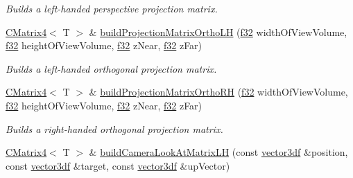 \begin{DoxyCompactItemize}
\begin{DoxyCompactList}\small\item\em Builds a left-\/handed perspective projection matrix. \end{DoxyCompactList}\item 
\hyperlink{classirr_1_1core_1_1CMatrix4}{C\+Matrix4}$<$ T $>$ \& \hyperlink{classirr_1_1core_1_1CMatrix4_ae4a0618e2da724a26a5d8a201a63d8a5}{build\+Projection\+Matrix\+Ortho\+LH} (\hyperlink{namespaceirr_a0277be98d67dc26ff93b1a6a1d086b07}{f32} width\+Of\+View\+Volume, \hyperlink{namespaceirr_a0277be98d67dc26ff93b1a6a1d086b07}{f32} height\+Of\+View\+Volume, \hyperlink{namespaceirr_a0277be98d67dc26ff93b1a6a1d086b07}{f32} z\+Near, \hyperlink{namespaceirr_a0277be98d67dc26ff93b1a6a1d086b07}{f32} z\+Far)\hypertarget{classirr_1_1core_1_1CMatrix4_ae4a0618e2da724a26a5d8a201a63d8a5}{}\label{classirr_1_1core_1_1CMatrix4_ae4a0618e2da724a26a5d8a201a63d8a5}

\begin{DoxyCompactList}\small\item\em Builds a left-\/handed orthogonal projection matrix. \end{DoxyCompactList}\item 
\hyperlink{classirr_1_1core_1_1CMatrix4}{C\+Matrix4}$<$ T $>$ \& \hyperlink{classirr_1_1core_1_1CMatrix4_ae7a837a3b2d86bfc830d25c6144b7a46}{build\+Projection\+Matrix\+Ortho\+RH} (\hyperlink{namespaceirr_a0277be98d67dc26ff93b1a6a1d086b07}{f32} width\+Of\+View\+Volume, \hyperlink{namespaceirr_a0277be98d67dc26ff93b1a6a1d086b07}{f32} height\+Of\+View\+Volume, \hyperlink{namespaceirr_a0277be98d67dc26ff93b1a6a1d086b07}{f32} z\+Near, \hyperlink{namespaceirr_a0277be98d67dc26ff93b1a6a1d086b07}{f32} z\+Far)\hypertarget{classirr_1_1core_1_1CMatrix4_ae7a837a3b2d86bfc830d25c6144b7a46}{}\label{classirr_1_1core_1_1CMatrix4_ae7a837a3b2d86bfc830d25c6144b7a46}

\begin{DoxyCompactList}\small\item\em Builds a right-\/handed orthogonal projection matrix. \end{DoxyCompactList}\item 
\hyperlink{classirr_1_1core_1_1CMatrix4}{C\+Matrix4}$<$ T $>$ \& \hyperlink{classirr_1_1core_1_1CMatrix4_a78e15297c806006898df58498755ecd4}{build\+Camera\+Look\+At\+Matrix\+LH} (const \hyperlink{namespaceirr_1_1core_a06f169d08b5c429f5575acb7edbad811}{vector3df} \&position, const \hyperlink{namespaceirr_1_1core_a06f169d08b5c429f5575acb7edbad811}{vector3df} \&target, const \hyperlink{namespaceirr_1_1core_a06f169d08b5c429f5575acb7edbad811}{vector3df} \&up\+Vector)\hypertarget{classirr_1_1core_1_1CMatrix4_a78e15297c806006898df58498755ecd4}{}\label{classirr_1_1core_1_1CMatrix4_a78e15297c806006898df58498755ecd4}


\end{DoxyCompactItemize}
